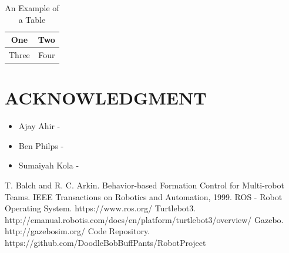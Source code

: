 \documentclass[letterpaper, 10 pt, conference]{ieeeconf}  %
\begin{document}
\begin{table}[h]
\caption{An Example of a Table}
\label{table_example}
\begin{center}
\begin{tabular}{|c||c|}
\hline
One & Two\\
\hline
Three & Four\\
\hline
\end{tabular}
\end{center}
\end{table}

\addtolength{\textheight}{-12cm}   %


\section{ACKNOWLEDGMENT}

\begin{itemize}
\item Ajay Ahir - 
\item Ben Philps - 
\item Sumaiyah Kola - 
\end{itemize}


\begin{thebibliography}{99}

 T. Balch and R. C. Arkin. Behavior-based Formation Control for Multi-robot Teams. IEEE Transactions on Robotics and Automation, 1999.
 ROS - Robot Operating System. https://www.ros.org/
 Turtlebot3. http://emanual.robotis.com/docs/en/platform/turtlebot3/overview/
 Gazebo. http://gazebosim.org/
 Code Repository. https://github.com/DoodleBobBuffPants/RobotProject

\end{thebibliography}
\end{document}
